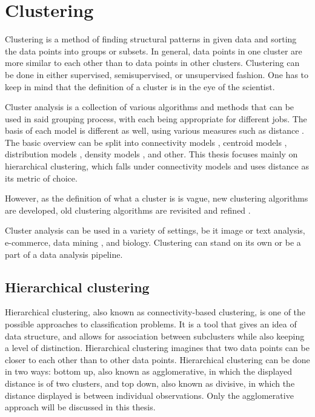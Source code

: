 \chapter{Clustering}
\label{chap:clustering}
Clustering is a method of finding structural patterns in given data and sorting the data points into groups or subsets. In general, data points in one cluster are more similar to each other than to data points in other clusters. Clustering can be done in either supervised, semisupervised, or unsupervised fashion. One has to keep in mind that the definition of a cluster is in the eye of the scientist.

Cluster analysis is a collection of various algorithms and methods that can be used in said grouping process, with each being appropriate for different jobs. The basis of each model is different as well, using various measures such as distance \citep{murtagh2017algorithms, hsu2007hierarchical}. The basic overview can be split into connectivity models \citep{fischer2003clustering}, centroid models \citep{morissette2013k, sun2014parallel}, distribution models \citep{jimenez2019extensions, bocchieri2001subspace}, density models \citep{campello2020density}, and other. This thesis focuses mainly on hierarchical clustering, which falls under connectivity models and uses distance as its metric of choice. 

However, as the definition of what a cluster is is vague, new clustering algorithms are developed, old clustering algorithms are revisited and refined \citep{estivill2002so}.

Cluster analysis can be used in a variety of settings, be it image or text analysis, e-commerce, data mining \citep{agarwal2013data}, and biology. Clustering can stand on its own or be a part of a data analysis pipeline. 

\section{Hierarchical clustering}
\label{sec:hierarchicalclustering}
Hierarchical clustering, also known as connectivity-based clustering, is one of the possible approaches to classification problems. It is a tool that gives an idea of data structure, and allows for association between subclusters while also keeping a level of distinction. Hierarchical clustering imagines that two data points can be closer to each other than to other data points. Hierarchical clustering can be done in two ways: bottom up, also known as agglomerative, in which the displayed distance is of two clusters, and top down, also known as divisive, in which the distance displayed is between individual observations. Only the agglomerative approach will be discussed in this thesis. 

